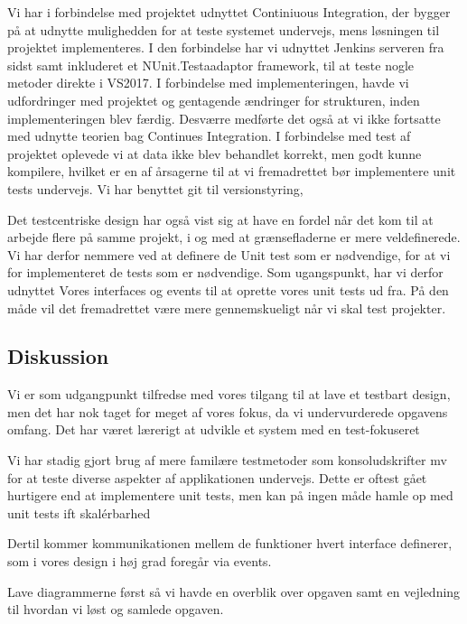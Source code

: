 Vi har i forbindelse med projektet udnyttet Continiuous Integration, 
der bygger på at udnytte mulighedden for at teste systemet undervejs, 
mens løsningen til projektet implementeres. 
I den forbindelse har vi udnyttet Jenkins serveren fra sidst samt inkluderet 
et NUnit.Testaadaptor framework, til at teste nogle metoder direkte i VS2017. 
I forbindelse med implementeringen, havde vi udfordringer med projektet 
og gentagende ændringer for strukturen, inden implementeringen blev færdig. 
Desværre medførte det også at vi ikke fortsatte med udnytte teorien bag Continues 
Integration. I forbindelse med test af projektet oplevede vi at data ikke blev 
behandlet korrekt, men godt kunne kompilere, hvilket er en af årsagerne til 
at vi fremadrettet bør implementere unit tests undervejs.
Vi har benyttet git til versionstyring, 

Det testcentriske design har også vist sig at have en fordel når det kom til at arbejde 
flere på samme projekt, i og med at grænsefladerne er mere veldefinerede. 
Vi har derfor nemmere ved at definere de Unit test som er nødvendige, 
for at vi for implementeret de tests som er nødvendige.
Som ugangspunkt, har vi derfor udnyttet Vores interfaces og events til 
at oprette vores unit tests ud fra. På den måde vil det fremadrettet være mere 
gennemskueligt når vi skal test projekter.



\subsection{Diskussion}
Vi er som udgangpunkt tilfredse med vores tilgang til at lave et testbart design, men det har nok taget for meget af vores fokus, da vi undervurderede opgavens omfang. 
Det har været lærerigt at udvikle et system med en test-fokuseret

Vi har stadig gjort brug af mere familære testmetoder som konsoludskrifter mv for at teste diverse aspekter af applikationen undervejs. 
Dette er oftest gået hurtigere end at implementere unit tests, men kan på ingen måde hamle op med unit tests ift skalérbarhed

Dertil kommer kommunikationen mellem de funktioner hvert interface definerer, som i vores design i høj grad foregår via events.

Lave diagrammerne først så vi havde en overblik over opgaven samt en vejledning til hvordan vi løst og samlede opgaven. 

 

